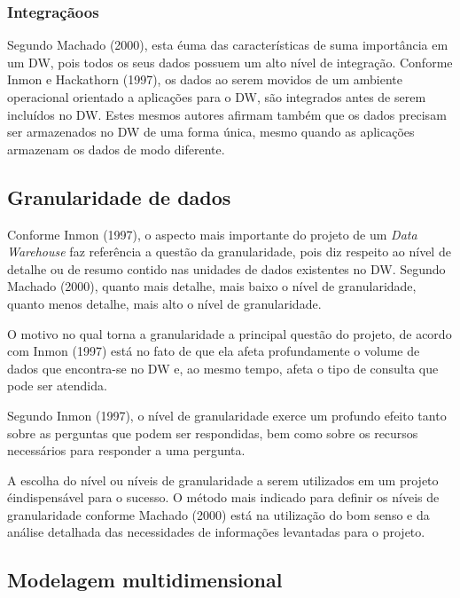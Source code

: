 \subsubsection{Integra\c{c}\~{a}oos}

Segundo Machado (2000), esta \'{e}uma das caracter\'{i}sticas de suma importância em um DW, pois todos os seus dados possuem um alto n\'{i}vel de integra\c{c}\~{a}o.
Conforme Inmon e Hackathorn (1997), os dados ao serem movidos de um ambiente operacional orientado a aplica\c{c}\~{o}es para o DW, s\~{a}o integrados antes de serem inclu\'{i}dos no DW. Estes mesmos autores afirmam tamb\'{e}m que os dados precisam ser armazenados no DW de uma forma única, mesmo quando as aplica\c{c}\~{o}es armazenam os dados de modo diferente.

\subsection{Granularidade de dados}

Conforme Inmon (1997), o aspecto mais importante do projeto de um \textit{Data Warehouse} faz referência a quest\~{a}o da granularidade, pois diz respeito ao n\'{i}vel de detalhe ou de resumo contido nas unidades de dados existentes no DW. Segundo Machado (2000), quanto mais detalhe, mais baixo o n\'{i}vel de granularidade, quanto menos detalhe, mais alto o n\'{i}vel de granularidade.

O motivo no qual torna a granularidade a principal quest\~{a}o do projeto, de acordo com Inmon (1997) est\'{a} no fato de que ela afeta profundamente o volume de dados que encontra-se no DW e, ao mesmo tempo, afeta o tipo de consulta que pode ser atendida.

Segundo Inmon (1997), o n\'{i}vel de granularidade exerce um profundo efeito tanto sobre as perguntas que podem ser respondidas, bem como sobre os recursos necess\'{a}rios para responder a uma pergunta.

A escolha do n\'{i}vel ou n\'{i}veis de granularidade a serem utilizados em um projeto \'{e}indispens\'{a}vel para o sucesso. O m\'{e}todo mais indicado para definir os n\'{i}veis de granularidade conforme Machado (2000) est\'{a} na utiliza\c{c}\~{a}o do bom senso e da an\'{a}lise detalhada das necessidades de informa\c{c}\~{o}es levantadas para o projeto.
	
\subsection{Modelagem multidimensional}

